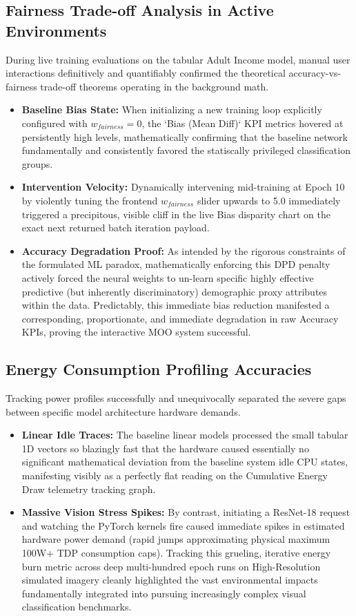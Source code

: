 \documentclass[12pt,a4paper]{article}
\begin{document}
\subsection{Fairness Trade-off Analysis in Active Environments}
During live training evaluations on the tabular Adult Income model, manual user interactions definitively and quantifiably confirmed the theoretical accuracy-vs-fairness trade-off theorems operating in the background math.
\begin{itemize}
    \item \textbf{Baseline Bias State:} When initializing a new training loop explicitly configured with $w_{fairness} = 0$, the `Bias (Mean Diff)` KPI metrics hovered at persistently high levels, mathematically confirming that the baseline network fundamentally and consistently favored the statiscally privileged classification groups.
    \item \textbf{Intervention Velocity:} Dynamically intervening mid-training at Epoch 10 by violently tuning the frontend $w_{fairness}$ slider upwards to 5.0 immediately triggered a precipitous, visible cliff in the live Bias disparity chart on the exact next returned batch iteration payload. 
    \item \textbf{Accuracy Degradation Proof:} As intended by the rigorous constraints of the formulated ML paradox, mathematically enforcing this DPD penalty actively forced the neural weights to un-learn specific highly effective predictive (but inherently discriminatory) demographic proxy attributes within the data. Predictably, this immediate bias reduction manifested a corresponding, proportionate, and immediate degradation in raw Accuracy KPIs, proving the interactive MOO system successful.
\end{itemize}

\subsection{Energy Consumption Profiling Accuracies}
Tracking power profiles successfully and unequivocally separated the severe gaps between specific model architecture hardware demands.
\begin{itemize}
    \item \textbf{Linear Idle Traces:} The baseline linear models processed the small tabular 1D vectors so blazingly fast that the hardware caused essentially no significant mathematical deviation from the baseline system idle CPU states, manifesting visibly as a perfectly flat reading on the Cumulative Energy Draw telemetry tracking graph.
    \item \textbf{Massive Vision Stress Spikes:} By contrast, initiating a ResNet-18 request and watching the PyTorch kernels fire caused immediate spikes in estimated hardware power demand (rapid jumps approximating physical maximum 100W+ TDP consumption caps). Tracking this grueling, iterative energy burn metric across deep multi-hundred epoch runs on High-Resolution simulated imagery cleanly highlighted the vast environmental impacts fundamentally integrated into pursuing increasingly complex visual classification benchmarks.
\end{itemize}
\end{document}
